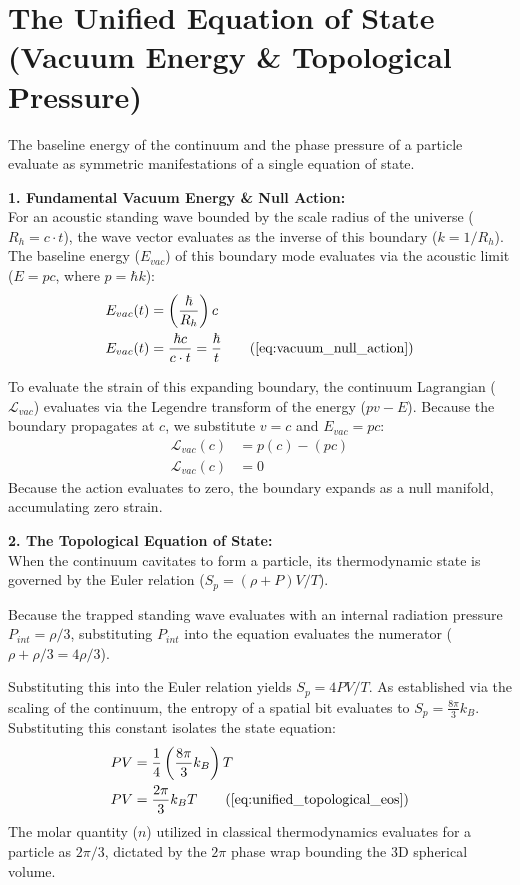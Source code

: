 \section{The Unified Equation of State (Vacuum Energy \& Topological Pressure)}
\label{sec:deriv_unified_eos}

The baseline energy of the continuum and the phase pressure of a particle evaluate as symmetric manifestations of a single equation of state. 

\textbf{1. Fundamental Vacuum Energy \& Null Action:} \\
For an acoustic standing wave bounded by the scale radius of the universe ($R_h = c \cdot t$), the wave vector evaluates as the inverse of this boundary ($k = 1/R_h$). The baseline energy ($E_{vac}$) of this boundary mode evaluates via the acoustic limit ($E = pc$, where $p = \hbar k$): 
\begin{align}
    E_{vac}(t) &= \left( \frac{\hbar}{R_h} \right) c  \\
    E_{vac}(t) &= \frac{\hbar c}{c \cdot t} = \frac{\hbar}{t} \tag{\ref{eq:vacuum_null_action}}
\end{align}

To evaluate the strain of this expanding boundary, the continuum Lagrangian ($\mathcal{L}_{vac}$) evaluates via the Legendre transform of the energy ($pv - E$). Because the boundary propagates at $c$, we substitute $v = c$ and $E_{vac} = pc$: 
\begin{align}
    \mathcal{L}_{vac}(c) &= p(c) - (pc)  \\
    \mathcal{L}_{vac}(c) &= 0 
\end{align}
Because the action evaluates to zero, the boundary expands as a null manifold, accumulating zero strain.

\textbf{2. The Topological Equation of State:} \\
When the continuum cavitates to form a particle, its thermodynamic state is governed by the Euler relation ($S_p = (\rho + P)V / T$). 

Because the trapped standing wave evaluates with an internal radiation pressure $P_{int} = \rho/3$, substituting $P_{int}$ into the equation evaluates the numerator ($\rho + \rho/3 = 4\rho/3$). 

Substituting this into the Euler relation yields $S_p = 4PV/T$. As established via the scaling of the continuum, the entropy of a spatial bit evaluates to $S_p = \frac{8\pi}{3} k_B$. Substituting this constant isolates the state equation: 
\begin{align}
    PV &= \frac{1}{4} \left( \frac{8\pi}{3} k_B \right) T  \\
    PV &= \frac{2\pi}{3} k_B T \tag{\ref{eq:unified_topological_eos}}
\end{align}
The molar quantity ($n$) utilized in classical thermodynamics evaluates for a particle as $2\pi/3$, dictated by the $2\pi$ phase wrap bounding the 3D spherical volume. 

